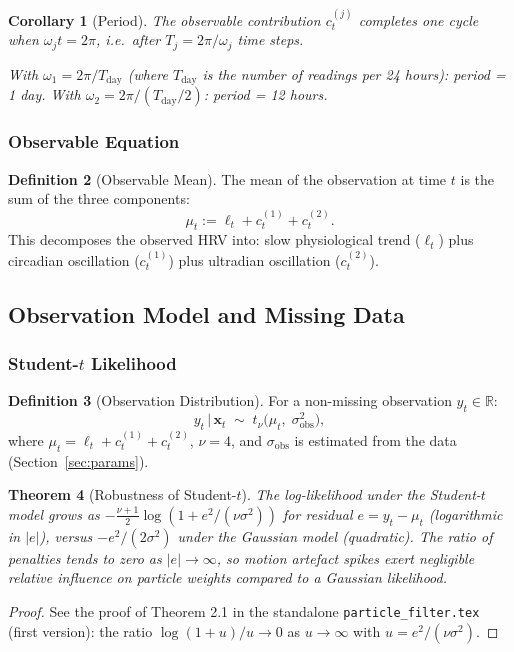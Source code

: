 \documentclass[11pt, a4paper]{article}
\theoremstyle{plain}
\newtheorem{theorem}{Theorem}[section]
\newtheorem{corollary}[theorem]{Corollary}
\theoremstyle{definition}
\newtheorem{definition}[theorem]{Definition}
\newcommand{\R}{\mathbb{R}}
\newcommand{\bx}{\mathbf{x}}
\newcommand{\given}{\,|\,}
\begin{document}
\begin{corollary}[Period]
The observable contribution $c_t^{(j)}$ completes one cycle when
$\omega_j t = 2\pi$, i.e.\ after $T_j = 2\pi/\omega_j$ time steps.

\noindent With $\omega_1 = 2\pi / T_{\mathrm{day}}$ (where $T_{\mathrm{day}}$
is the number of readings per 24 hours): period = 1 day.
With $\omega_2 = 2\pi / (T_{\mathrm{day}}/2)$: period = 12 hours.
\end{corollary}

\subsubsection{Observable Equation}

\begin{definition}[Observable Mean]
The mean of the observation at time $t$ is the sum of the three components:
\begin{equation}
  \mu_t := \ell_t + c_t^{(1)} + c_t^{(2)}.
  \label{eq:observable}
\end{equation}
This decomposes the observed HRV into: slow physiological trend ($\ell_t$)
plus circadian oscillation ($c_t^{(1)}$) plus ultradian oscillation ($c_t^{(2)}$).
\end{definition}

\subsection{Observation Model and Missing Data}

\subsubsection{Student-$t$ Likelihood}

\begin{definition}[Observation Distribution]
For a non-missing observation $y_t \in \R$:
\begin{equation}
  y_t \given \bx_t \;\sim\; t_\nu\!\bigl(\mu_t,\; \sigma_{\mathrm{obs}}^2\bigr),
  \label{eq:obs}
\end{equation}
where $\mu_t = \ell_t + c_t^{(1)} + c_t^{(2)}$, $\nu = 4$, and
$\sigma_{\mathrm{obs}}$ is estimated from the data (Section~\ref{sec:params}).
\end{definition}

\begin{theorem}[Robustness of Student-$t$]
The log-likelihood under the Student-$t$ model grows as
$-\tfrac{\nu+1}{2}\log(1 + e^2/(\nu\sigma^2))$ for residual $e = y_t - \mu_t$
(logarithmic in $|e|$), versus $-e^2/(2\sigma^2)$ under the Gaussian model
(quadratic). The ratio of penalties tends to zero as $|e| \to \infty$,
so motion artefact spikes exert negligible relative influence on particle
weights compared to a Gaussian likelihood.
\end{theorem}
\begin{proof}
See the proof of Theorem 2.1 in the standalone \texttt{particle\_filter.tex}
(first version): the ratio $\log(1+u)/u \to 0$ as $u \to \infty$ with
$u = e^2/(\nu\sigma^2)$.
\end{proof}
\end{document}
